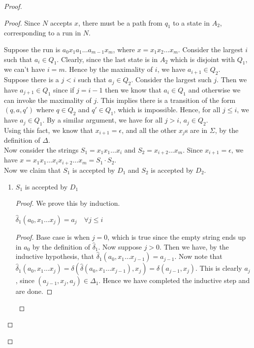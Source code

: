 \documentclass[a4paper]{article}
\begin{document}
\begin{proof}
    \begin{proof}
        Since $N$ accepts $x$, there must be a path from $q_1$ to a state in $A_2$, corresponding to a run in $N$.

        Suppose the run is $a_0 x_1 a_1 \ldots a_{m-1} x_m$, where $x = x_1x_2\ldots x_m$. Consider the largest $i$ such that $a_i \in Q_1$. Clearly, since the last state is in $A_2$ which is
        disjoint with $Q_1$, we can't have $i = m$. Hence by the maximality of $i$, we have $a_{i+1} \in Q_2$.\\

        Suppose there is a $j < i$ such that $a_j \in Q_2$. Consider the largest such $j$. Then we have $a_{j+1} \in Q_1$ since if $j = i - 1$ then we know that $a_i \in Q_1$ and otherwise we can
        invoke the maximality of $j$. This implies there is a transition of the form $(q, a, q')$ where $q \in Q_2$ and $q' \in Q_1$, which is impossible. Hence, for all $j \le i$, we have $a_j
        \in
        Q_1$. By a similar argument, we have for all $j > i$, $a_j \in Q_2$.\\

        Using this fact, we know that $x_{i+1} = \epsilon$, and all the other $x_j$s are in $\Sigma$, by the definition of $\Delta$.\\

        Now consider the strings $S_1 = x_1 x_1 \ldots x_i$ and $S_2 = x_{i+2} \ldots x_m$. Since $x_{i+1} = \epsilon$, we have $x = x_1 x_1 \ldots x_i x_{i+2} \ldots x_m = S_1 \cdot S_2$.\\

        Now we claim that $S_1$ is accepted by $D_1$ and $S_2$ is accepted by $D_2$.

        \begin{enumerate}
            \item $S_1$ is accepted by $D_1$
                \begin{proof}

                    We prove this by induction.

                    \begin{claim}
                        $\hat{\delta}_1(a_0, x_1\ldots x_j) = a_j \quad \forall j \le i$
                    \end{claim}

                    \begin{proof}
                        Base case is when $j = 0$, which is true since the empty string ends up in $a_0$ by the definition of $\hat{\delta}_1$. Now suppose $j > 0$. Then we have, by the
                        inductive hypothesis, that $\hat{\delta}_1(a_0, x_1\ldots x_{j-1}) = a_{j-1}$. Now note that $\hat{\delta}_1(a_0, x_1 \ldots x_j) = \delta(\hat{\delta}(a_0,
                        x_1\ldots x_{j-1}), x_j) = \delta(a_{j-1}, x_j)$.
                        This is clearly $a_j$, since $(a_{j-1}, x_j, a_j) \in \Delta_1$. Hence we have completed the inductive step and are done.
                    \end{proof}


\end{proof}
\end{enumerate}
\end{proof}
\end{proof}
\end{document}

